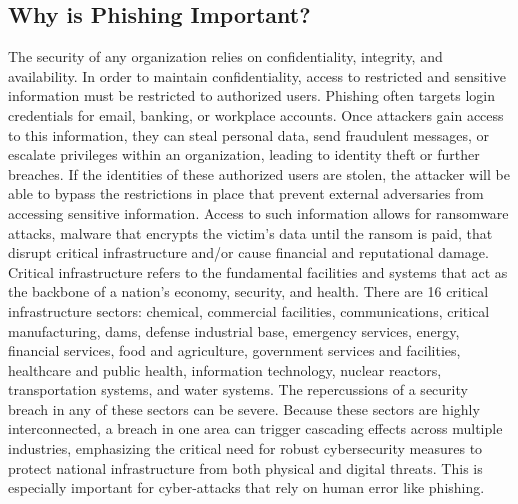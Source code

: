 \documentclass[10pt,twocolumn]{article}
\begin{document}
\subsection{Why is Phishing Important?}
The security of any organization relies on confidentiality, integrity, and availability. \cite{comprehensive_review} 
In order to maintain confidentiality, access to restricted and sensitive information must be restricted to authorized users. Phishing often targets login credentials for email, banking, or workplace accounts. Once attackers gain access to this information, they can steal personal data, send fraudulent messages, or escalate privileges within an organization, leading to identity theft or further breaches. If the identities of these authorized users are stolen, the attacker will be able to bypass the restrictions in place that prevent external adversaries from accessing sensitive information.
Access to such information allows for ransomware attacks, malware that encrypts the victim's data until the ransom is paid, that disrupt critical infrastructure and/or cause financial and reputational damage. Critical infrastructure refers to the fundamental facilities and systems that act as the backbone of a nation's economy, security, and health. There are 16 critical infrastructure sectors: chemical, commercial facilities, communications, critical manufacturing, dams, defense industrial base, emergency services, energy, financial services, food and agriculture, government services and facilities, healthcare and public health, information technology, nuclear reactors, transportation systems, and water systems. The repercussions of a security breach in any of these sectors can be severe.  Because these sectors are highly interconnected, a breach in one area can trigger cascading effects across multiple industries, emphasizing the critical need for robust cybersecurity measures to protect national infrastructure from both physical and digital threats. This is especially important for cyber-attacks that rely on human error like phishing.
\end{document}
